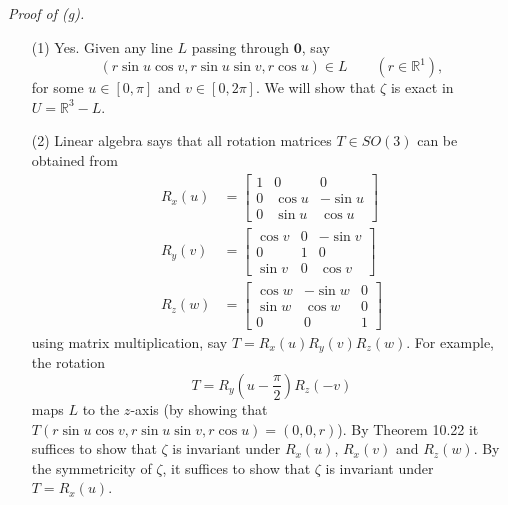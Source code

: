 \documentclass{article}
\begin{document}
\emph{Proof of (g).}
\begin{enumerate}
\item[(1)]
  Yes.
  Given any line $L$ passing through $\mathbf{0}$,
  say
  \[
    (r \sin u \cos v, r \sin u \sin v, r \cos u) \in L
    \qquad
    (r \in \mathbb{R}^1),
  \]
  for some $u \in [0,\pi]$ and $v \in [0,2\pi]$.
  We will show that $\zeta$ is exact in $U = \mathbb{R}^3 - L$.

\item[(2)]
  Linear algebra says that all rotation matrices $T \in SO(3)$ can be obtained from
  \begin{align*}
    R_x(u)
    &=
    \begin{bmatrix}
      1 &      0 &       0 \\
      0 & \cos u & -\sin u \\
      0 & \sin u &  \cos u
    \end{bmatrix} \\
    R_y(v)
    &=
    \begin{bmatrix}
      \cos v & 0 & -\sin v \\
           0 & 1 &       0 \\
      \sin v & 0 &  \cos v
    \end{bmatrix} \\
    R_z(w)
    &=
    \begin{bmatrix}
      \cos w & -\sin w & 0 \\
      \sin w &  \cos w & 0 \\
           0 &       0 & 1
    \end{bmatrix}
  \end{align*}
  using matrix multiplication,
  say $T = R_x(u)R_y(v)R_z(w)$.
  For example, the rotation
  \[
    T = R_y\left(u-\frac{\pi}{2}\right)R_z(-v)
  \]
  maps $L$ to the $z$-axis
  (by showing that $T(r \sin u \cos v, r \sin u \sin v, r \cos u) = (0,0,r)$).
  By Theorem 10.22
  it suffices to show that $\zeta$ is invariant under $R_x(u)$, $R_x(v)$ and $R_z(w)$.
  By the symmetricity of $\zeta$, it suffices to show that $\zeta$ is invariant under $T = R_x(u)$.


\end{enumerate}
\end{document}
